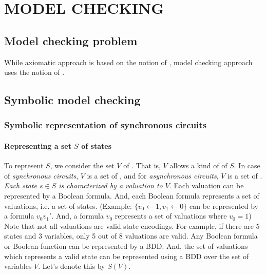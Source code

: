 \section{MODEL CHECKING}
\subsection{Model checking problem}
\bit
\w While axiomatic approach is based on the notion of , model
checking approach uses the notion of .
\w 
\eit

\subsection{Symbolic model checking}
\subsubsection{Symbolic representation of synchronous circuits} 
\paragraph{Representing a set $S$ of states}
\bit
\w To represent  $S$, we
   consider the set $V$ of .
   That is, $V$ allows a kind of  of $S$.
   In case of {\em synchronous circuits\/}, $V$ is a set of , and for {\em asynchronous circuits\/}, $V$ is a set of .
   {\em Each state $s \in S$ is characterized by a valuation to $V$\/}.
\w Each valuation can be represented by a Boolean formula. 
   And, each Boolean formula represents a set of valuations, i.e. a set of
   states. (Example: $\{v_0 \leftarrow 1, v_1 \leftarrow 0\}$ can be
   represented by a formula $v_0v_1'$. And, a formula $v_0$ represents a set of
   valuations where 
   $v_0 = 1$)
\w Note that not all valuations are valid state encodings. For example, if
there are 5 states and 3 variables, only 5 out of 8 valuations are valid.
\w Any Boolean formula or Boolean function can be represented by a BDD. And,
the set of valuations which represents a valid state can be represented using
a BDD over the set of variables $V$. Let's denote this by $S(V)$.
\eit
